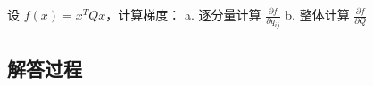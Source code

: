 \begin{example}[二次型梯度]
    设 \(f(x) = x^T Qx\)，计算梯度：  
    a. 逐分量计算 \(\frac{\partial f}{\partial q_{ij}}\)  
    b. 整体计算 \(\frac{\partial f}{\partial Q}\)
    \end{example}
    
    \subsection*{解答过程}
    